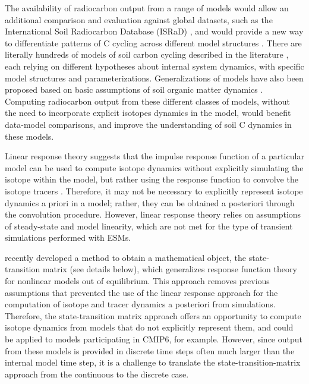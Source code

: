 \documentclass[draft]{agujournal2019}
\begin{document}
The availability of radiocarbon output from a range of models would allow an additional comparison and evaluation against global datasets, such as the International Soil Radiocarbon Database (ISRaD) \cite{Lawrence2019}, and would provide a new way to differentiate patterns of C cycling across different model structures \cite{Sierra2014}. There are literally hundreds of models of soil carbon cycling described in the literature \cite{Manzoni2009SBB}, each relying on different hypotheses about internal system dynamics, with specific model structures and parameterizations. Generalizations of models have also been proposed based on basic assumptions of soil organic matter dynamics \cite{Sierra2015}. Computing radiocarbon output from these different classes of models, without the need to incorporate explicit isotopes dynamics in the model, would benefit data-model comparisons, and improve the understanding of soil C dynamics in these models.

Linear response theory suggests that the impulse response function of a particular model can be used to compute isotope dynamics without explicitly simulating the isotope within the model, but rather using the response function to convolve the isotope tracers \cite{Thompson1999}. Therefore, it may not be necessary to explicitly represent isotope dynamics a priori in a model; rather, they can be obtained a posteriori through the convolution procedure. However, linear response theory relies on assumptions of steady-state and model linearity, which are not met for the type of transient simulations performed with ESMs. 

 recently developed a method to obtain a mathematical object, the state-transition matrix (see details below), which generalizes response function theory for nonlinear models out of equilibrium. This approach removes previous assumptions that prevented the use of the linear response approach for the computation of isotope and tracer dynamics a posteriori from simulations. Therefore, the state-transition matrix approach offers an opportunity to compute isotope dynamics from models that do not explicitly represent them, and could be applied to models participating in CMIP6, for example. However, since output from these models is provided in discrete time steps often much larger than the internal model time step, it is a challenge to translate the state-transition-matrix approach from the continuous to the discrete case.
\end{document}
